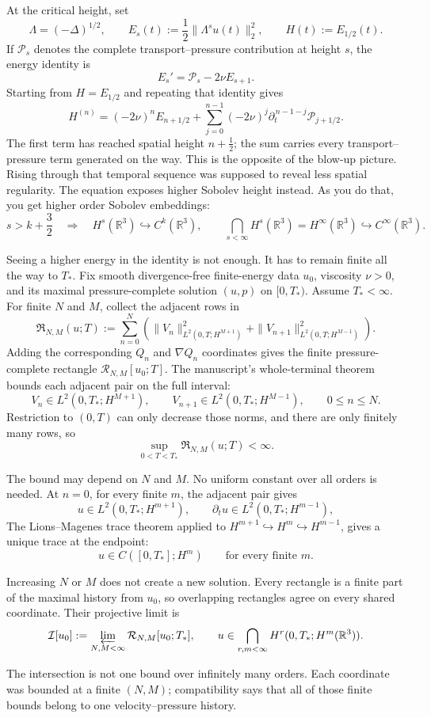 At the critical height, set
\[
\Lambda=(-\Delta)^{1/2},
\qquad
E_s(t):=\frac12\|\Lambda^su(t)\|_2^2,
\qquad
H(t):=E_{1/2}(t).
\]
If \(\mathcal P_s\) denotes the complete transport--pressure contribution at
height \(s\), the energy identity is
\[
E_s'=\mathcal P_s-2\nu E_{s+1}.
\]
Starting from \(H=E_{1/2}\) and repeating that identity gives
\[
H^{(n)}
=(-2\nu)^nE_{n+1/2}
 +\sum_{j=0}^{n-1}(-2\nu)^j
   \partial_t^{\,n-1-j}\mathcal P_{j+1/2}.
\]
The first term has reached spatial height \(n+\tfrac12\); the sum carries every
transport--pressure term generated on the way. This is the opposite of the
blow-up picture. Rising through that temporal sequence was supposed to reveal
less spatial regularity. The equation exposes higher Sobolev height instead. As
you do that, you get higher order Sobolev embeddings:
\[
s>k+\frac32
\quad\Longrightarrow\quad
H^s(\mathbb R^3)\hookrightarrow C^k(\mathbb R^3),
\qquad
\bigcap_{s<\infty}H^s(\mathbb R^3)
=H^\infty(\mathbb R^3)
\hookrightarrow C^\infty(\mathbb R^3).
\]

Seeing a higher energy in the identity is not enough. It has to remain finite
all the way to \(T_*\). Fix smooth divergence-free finite-energy data \(u_0\),
viscosity \(\nu>0\), and its maximal pressure-complete solution \((u,p)\) on
\([0,T_*)\). Assume \(T_*<\infty\). For finite \(N\) and \(M\), collect the
adjacent rows in
\[
\mathfrak R_{N,M}(u;T)
:=\sum_{n=0}^{N}\left(
  \|V_n\|_{L^2(0,T;H^{M+1})}^2
 +\|V_{n+1}\|_{L^2(0,T;H^{M-1})}^2
\right).
\]
Adding the corresponding \(Q_n\) and \(\nabla Q_n\) coordinates gives the
finite pressure-complete rectangle \(\mathcal R_{N,M}[u_0;T]\). The
manuscript's whole-terminal theorem bounds each adjacent pair on the full
interval:
\[
V_n\in L^2(0,T_*;H^{M+1}),
\qquad
V_{n+1}\in L^2(0,T_*;H^{M-1}),
\qquad 0\le n\le N.
\]
Restriction to \((0,T)\) can only decrease those norms, and there are only
finitely many rows, so
\[
\sup_{0<T<T_*}\mathfrak R_{N,M}(u;T)<\infty.
\]
\begin{samepage}
The bound may depend on \(N\) and \(M\). No uniform constant over all orders is
needed. At \(n=0\), for every finite \(m\), the adjacent pair gives
\[
u\in L^2(0,T_*;H^{m+1}),
\qquad
\partial_tu\in L^2(0,T_*;H^{m-1}),
\]
The Lions--Magenes trace theorem applied to
\(H^{m+1}\hookrightarrow H^m\hookrightarrow H^{m-1}\), gives a unique
trace at the endpoint:
\[
u\in C([0,T_*];H^m)
\qquad\text{for every finite }m.
\]
\end{samepage}

\begin{samepage}
Increasing \(N\) or \(M\) does not create a new solution. Every rectangle is a
finite part of the maximal history from \(u_0\), so overlapping rectangles
agree on every shared coordinate. Their projective limit is
\[
\mathcal I[u_0]
:=\varprojlim_{N,M<\infty}\mathcal R_{N,M}[u_0;T_*],
\qquad
u\in\bigcap_{r,m<\infty}H^r(0,T_*;H^m(\mathbb R^3)).
\]
\end{samepage}
The intersection is not one bound over infinitely many orders. Each coordinate
was bounded at a finite \((N,M)\); compatibility says that all of those finite
bounds belong to one velocity--pressure history.


